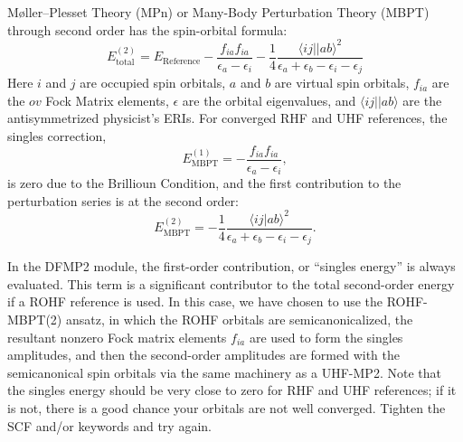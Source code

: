M\o{}ller--Plesset Theory (MPn) or Many-Body Perturbation Theory (MBPT) through second order has the spin-orbital formula:
\begin{equation}
E_{\mathrm{total}}^{(2)}  = E_{\mathrm{Reference}} - \frac{f_{ia}
f_{ia}}{\epsilon_a - \epsilon_i} - \frac{1}{4} \frac{\langle ij||ab\rangle^2}{\epsilon_a + \epsilon_b - \epsilon_i - \epsilon_j}
\end{equation}
Here $i$ and $j$ are occupied spin orbitals, $a$ and $b$ are virtual spin
orbitals, $f_{ia}$ are the $ov$ Fock Matrix elements, $\epsilon$ are the orbital
eigenvalues, and $\langle ij||ab\rangle$ are the antisymmetrized physicist's ERIs. For
converged RHF and UHF references, the singles correction,
\begin{equation}
E_{\mathrm{MBPT}}^{(1)} = - \frac{f_{ia} f_{ia}}{\epsilon_a - \epsilon_i},
\end{equation}
is zero due to the Brillioun Condition, and the first contribution to the perturbation series is at the second order:
\begin{equation}
E_{\mathrm{MBPT}}^{(2)}  = - \frac{1}{4} \frac{\langle ij|ab\rangle^2}{\epsilon_a + \epsilon_b - \epsilon_i - \epsilon_j}.
\end{equation}

In the DFMP2 module, the first-order contribution, or ``singles energy'' is
always evaluated. This term is a significant contributor to the total
second-order energy if a ROHF reference is used. In this case, we have chosen
to use the ROHF-MBPT(2) ansatz, in which the ROHF orbitals are
semicanonicalized, the resultant nonzero Fock matrix elements $f_{ia}$ are used
to form the singles amplitudes, and then the second-order amplitudes are formed
with the semicanonical spin orbitals via the same machinery as a UHF-MP2. Note
that the singles energy should be very close to zero for RHF and UHF references;
if it is not, there is a good chance your orbitals are not well converged.
Tighten the SCF  and/or  keywords
and try again. 

